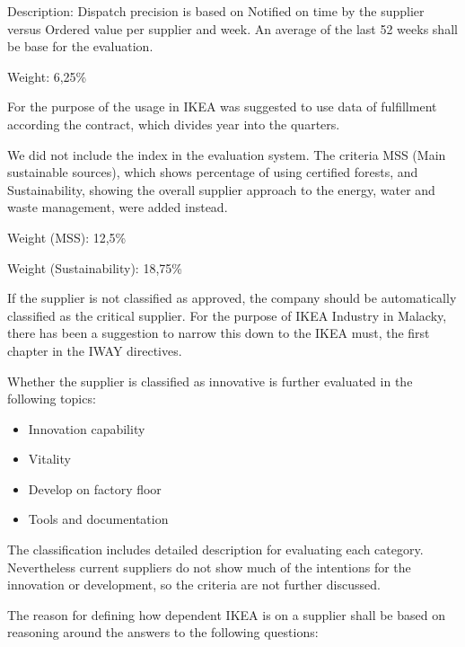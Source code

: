 \documentclass[oneside,12pt]{article}%
\begin{document}
Description: Dispatch precision is based on Notified on time by the supplier versus Ordered value per supplier and week. An average of the last 52 weeks shall be base for the evaluation. \par
Weight: 6,25\% \par
For the purpose of the usage in IKEA was suggested to use data of fulfillment according the contract, which divides year into the quarters.

We did not include the index in the evaluation system. The criteria MSS (Main sustainable sources), which shows percentage of using certified forests, and Sustainability, showing the overall supplier approach to the energy, water and waste management, were added instead. \par
Weight (MSS): 12,5\% \par
Weight (Sustainability): 18,75\% \par

If the supplier is not classified as approved, the company should be automatically classified as the critical supplier. For the purpose of IKEA Industry in Malacky, there has been a suggestion to narrow this down to the IKEA must, the first chapter in the IWAY directives.


Whether the supplier is classified as innovative is further evaluated in the following topics:
\begin{itemize}
  \item Innovation capability
  \item Vitality
  \item Develop on factory floor
  \item Tools and documentation
\end{itemize}
The classification includes detailed description for evaluating each category. Nevertheless current suppliers do not show much of the intentions for the innovation or development, so the criteria are not further discussed.


The reason for defining how dependent IKEA is on a supplier shall be based on reasoning around the answers to the following questions:
\end{document}
